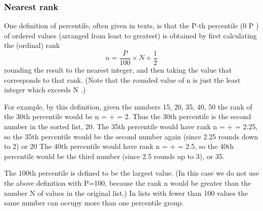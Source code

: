 \begin{frame}
\frametitle{Nearest rank}
One definition of percentile, often given in texts, is that the P-th percentile (0 \le P ) of 
ordered values (arranged from least to greatest) is obtained by first calculating the (ordinal) rank
 \[n = \frac{P}{100} \times N + \frac{1}{2}\]
rounding the result to the nearest integer, and then taking the value that corresponds to that rank. (Note that the rounded value of n is just the least integer which exceeds   \times N .)
\end{frame}
For example, by this definition, given the numbers
15, 20, 35, 40, 50
the rank of the 30th percentile would be
n =   +  = 2.
Thus the 30th percentile is the second number in the sorted list, 20.
The 35th percentile would have rank
n =   +  = 2.25,
so the 35th percentile would be the second number again (since 2.25 rounds down to 2) or 20
The 40th percentile would have rank
n =   +  = 2.5,
so the 40th percentile would be the third number (since 2.5 rounds up to 3), or 35.

The 100th percentile is defined to be the largest value. (In this case we do not use the above definition with P=100, because the rank n would be greater than the number N of values in the original list.)
In lists with fewer than 100 values the same number can occupy more than one percentile group.
